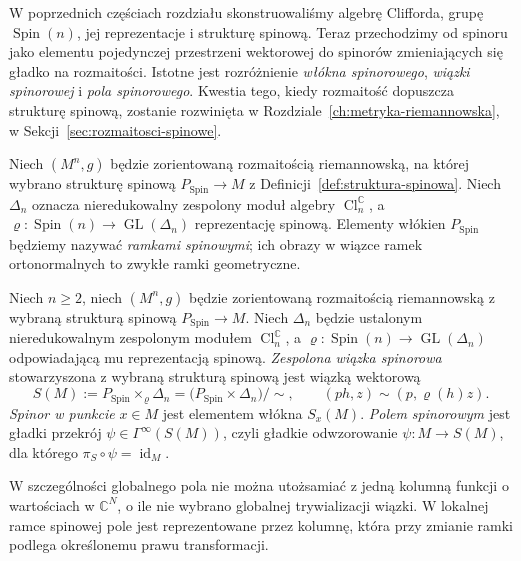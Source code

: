 W poprzednich częściach rozdziału skonstruowaliśmy algebrę Clifforda,
grupę $\operatorname{Spin}(n)$, jej reprezentacje i strukturę spinową. Teraz przechodzimy od spinoru jako elementu pojedynczej
przestrzeni wektorowej do spinorów zmieniających się gładko na
rozmaitości. Istotne jest rozróżnienie \emph{włókna spinorowego},
\emph{wiązki spinorowej} i \emph{pola spinorowego}. Kwestia tego,
kiedy rozmaitość dopuszcza strukturę spinową, zostanie rozwinięta
w Rozdziale~\ref{ch:metryka-riemannowska},
w Sekcji~\ref{sec:rozmaitosci-spinowe}.

Niech $(M^n,g)$ będzie zorientowaną rozmaitością riemannowską,
na której wybrano strukturę spinową
$P_{\mathrm{Spin}}\to M$ z Definicji~\ref{def:struktura-spinowa}.
Niech $\Delta_n$ oznacza nieredukowalny zespolony moduł algebry
$\operatorname{Cl}^{\mathbb C}_n$, a
$\varrho:\operatorname{Spin}(n)\to\operatorname{GL}(\Delta_n)$
reprezentację spinową. Elementy włókien $P_{\mathrm{Spin}}$
będziemy nazywać \emph{ramkami spinowymi}; ich obrazy
w wiązce ramek ortonormalnych to zwykłe ramki geometryczne.

\begin{definicja}
\label{def:pole-spinorowe-globalne}
Niech $n\geq2$, niech $(M^n,g)$ będzie zorientowaną rozmaitością
riemannowską z wybraną strukturą spinową $P_{\mathrm{Spin}}\to M$.
Niech $\Delta_n$ będzie ustalonym nieredukowalnym zespolonym
modułem $\operatorname{Cl}^{\mathbb C}_n$, a
$\varrho:\operatorname{Spin}(n)\to\operatorname{GL}(\Delta_n)$
odpowiadającą mu reprezentacją spinową.
\emph{Zespolona wiązka spinorowa} stowarzyszona
z wybraną strukturą spinową jest wiązką wektorową
\begin{equation}\label{eq:pola-spinorowe-wiazka}
 S(M):=P_{\mathrm{Spin}}\times_{\varrho}\Delta_n
 =\bigl(P_{\mathrm{Spin}}\times\Delta_n\bigr)/{\sim},
 \qquad (ph,z)\sim(p,\varrho(h)z).
\end{equation}
\emph{Spinor w punkcie} $x\in M$ jest elementem włókna
$S_x(M)$. \emph{Polem spinorowym} jest gładki przekrój
$\psi\in\Gamma^\infty(S(M))$, czyli gładkie odwzorowanie
$\psi:M\to S(M)$, dla którego
$\pi_S\circ\psi=\operatorname{id}_M$.
\end{definicja}

W szczególności globalnego pola nie można utożsamiać z jedną
kolumną funkcji o wartościach w $\mathbb C^N$, o ile nie
wybrano globalnej trywializacji wiązki. W lokalnej ramce
spinowej pole jest reprezentowane przez kolumnę, która
przy zmianie ramki podlega określonemu prawu transformacji.

